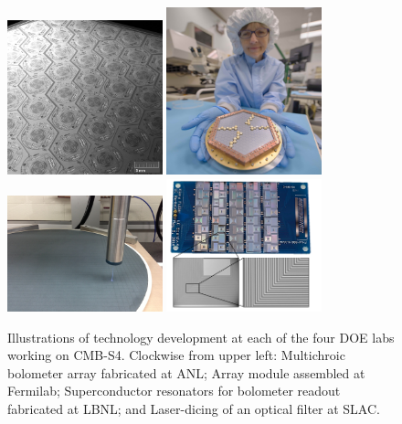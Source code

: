 \begin{figure}[t!]
\centering
\includegraphics[width=0.4\textwidth]{Instrumentation/ANL-Fab-Detector-Array.png}
\includegraphics[trim=0.0in 0.8in 0.0in 4.5in,clip=true,width=0.4\textwidth]{Instrumentation/FNAL_spt3g_wafer_assembly.jpg}
\includegraphics[width=0.4\textwidth]{Instrumentation/SLAC_laser.jpg}
\includegraphics[width=0.4\textwidth]{Instrumentation/LCChipInset2.png}
\caption{Illustrations of technology development at each of the four DOE labs working on CMB-S4.  Clockwise from upper left:  Multichroic bolometer array fabricated at ANL; Array module assembled at Fermilab; Superconductor resonators for bolometer readout fabricated at LBNL; and Laser-dicing of an optical filter at SLAC.}
\label{fig:tes_array}
\end{figure}



